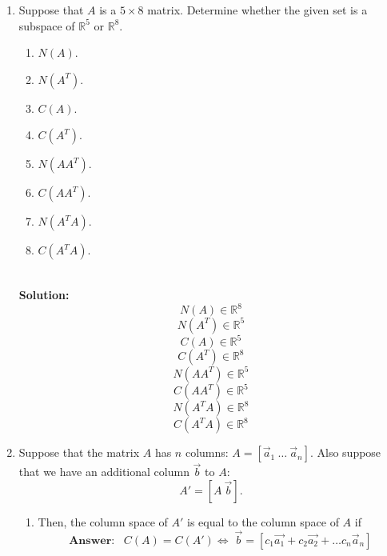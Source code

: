 \documentclass[12pt]{article}
\begin{document}
\begin{enumerate}
\item Suppose that $A$ is a $5 \times 8$ matrix.  Determine whether the given set is a subspace of $\mathbb{R}^{5}$ or $\mathbb{R}^{8}$. 
\begin{enumerate}
    \item $N(A)$.
    \item $N(A^{T})$.
    \item $C(A)$.
    \item $C(A^{T})$.
    \item $N(AA^{T})$.
      \item $C(AA^{T})$.
        \item $N(A^{T}A)$.
                \item $C(A^{T}A)$.
\end{enumerate}
\\
\textbf{Solution:}
\\
\[
N(A)\in\mathbb{R}^8
\]
\[
N(A^T)\in\mathbb{R}^5
\]
\[
C(A)\in\mathbb{R}^5
\]
\[
C(A^T)\in\mathbb{R}^8
\]
\[
N(AA^T)\in\mathbb{R}^5
\]
\[
C(AA^T)\in\mathbb{R}^5
\]
\[
N(A^TA)\in\mathbb{R}^8
\]
\[
C(A^TA)\in\mathbb{R}^8
\]



    
 \item Suppose that the matrix $A$ has $n$ columns: $A = [\vec a_1 \ \ldots \ \vec a_n]$.  Also suppose that we have an additional column $\vec b$ to $A$: \[A' = [A \ \vec b].\]
\begin{enumerate}
	\item 	Then, the column space of $A'$ is equal to the column space of $A$ if\\
\[
\textbf{Answer:} \;\;\;C(A)=C(A')\iff \; \Vec{b} = [c_1\Vec{a_1}+c_2\Vec{a_2}+ \ldots c_n\vec a_n]
\]


\end{enumerate}
\end{enumerate}
\end{document}
